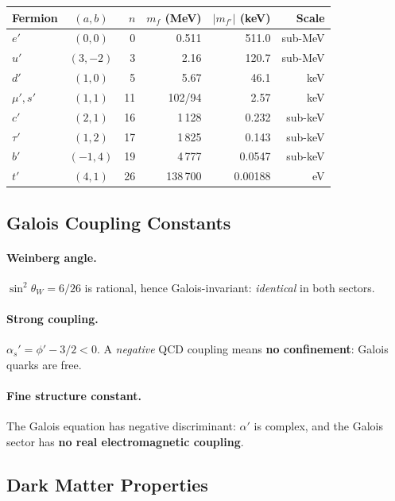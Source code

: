 \documentclass[12pt,a4paper]{article}
\theoremstyle{definition}
\begin{document}
\begin{center}
\begin{tabular}{lcrrrr}
\toprule
\textbf{Fermion} & $(a,b)$ & $n$ & $m_f$ (MeV) & $|m_{f'}|$ (keV) & \textbf{Scale} \\
\midrule
$e'$   & $(0,0)$   & 0  & 0.511        & 511.0   & sub-MeV \\
$u'$   & $(3,-2)$  & 3  & 2.16         & 120.7   & sub-MeV \\
$d'$   & $(1,0)$   & 5  & 5.67         & 46.1    & keV \\
$\mu', s'$ & $(1,1)$ & 11 & 102/94    & 2.57    & keV \\
$c'$   & $(2,1)$   & 16 & 1\,128       & 0.232   & sub-keV \\
$\tau'$ & $(1,2)$  & 17 & 1\,825       & 0.143   & sub-keV \\
$b'$   & $(-1,4)$  & 19 & 4\,777       & 0.0547  & sub-keV \\
$t'$   & $(4,1)$   & 26 & 138\,700     & 0.00188 & eV \\
\bottomrule
\end{tabular}
\end{center}

\subsection{Galois Coupling Constants}

\paragraph{Weinberg angle.}  $\sin^2\theta_W = 6/26$ is rational, hence Galois-invariant: \emph{identical} in both sectors.

\paragraph{Strong coupling.}  $\alpha_s' = \phi' - 3/2 < 0$.  A \emph{negative} QCD coupling means \textbf{no confinement}: Galois quarks are free.

\paragraph{Fine structure constant.}  The Galois equation has negative discriminant: $\alpha'$ is complex, and the Galois sector has \textbf{no real electromagnetic coupling}.

\subsection{Dark Matter Properties}
\end{document}

